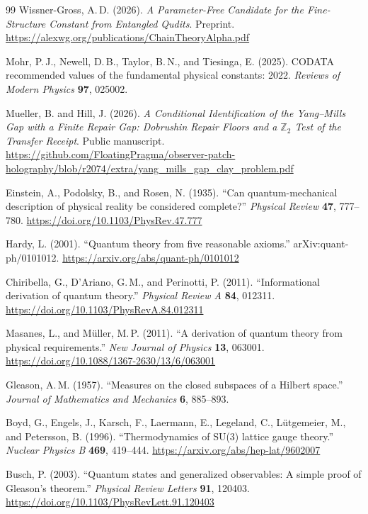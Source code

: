 \documentclass[11pt]{article}
\theoremstyle{definition}
\theoremstyle{remark}
\begin{document}
{\begin{thebibliography}{99}
Wissner-Gross, A.\,D. (2026).
\emph{A Parameter-Free Candidate for the Fine-Structure Constant from Entangled Qudits}.
Preprint.
\url{https://alexwg.org/publications/ChainTheoryAlpha.pdf}

Mohr, P.\,J., Newell, D.\,B., Taylor, B.\,N., and Tiesinga, E. (2025).
CODATA recommended values of the fundamental physical constants: 2022.
\emph{Reviews of Modern Physics} \textbf{97}, 025002.

Mueller, B. and Hill, J. (2026). \emph{A Conditional Identification of the Yang--Mills Gap with a Finite Repair Gap: Dobrushin Repair Floors and a \(\mathbb Z_2\) Test of the Transfer Receipt}. Public manuscript.
\url{https://github.com/FloatingPragma/observer-patch-holography/blob/r2074/extra/yang_mills_gap_clay_problem.pdf}

Einstein, A., Podolsky, B., and Rosen, N. (1935). ``Can quantum-mechanical
description of physical reality be considered complete?''
\emph{Physical Review} \textbf{47}, 777--780.
\url{https://doi.org/10.1103/PhysRev.47.777}

Hardy, L. (2001). ``Quantum theory from five reasonable axioms.''
arXiv:quant-ph/0101012.
\url{https://arxiv.org/abs/quant-ph/0101012}

Chiribella, G., D'Ariano, G.\,M., and Perinotti, P. (2011).
``Informational derivation of quantum theory.''
\emph{Physical Review A} \textbf{84}, 012311.
\url{https://doi.org/10.1103/PhysRevA.84.012311}

Masanes, L., and M\"uller, M.\,P. (2011).
``A derivation of quantum theory from physical requirements.''
\emph{New Journal of Physics} \textbf{13}, 063001.
\url{https://doi.org/10.1088/1367-2630/13/6/063001}

Gleason, A.\,M. (1957). ``Measures on the closed subspaces of a Hilbert
space.'' \emph{Journal of Mathematics and Mechanics} \textbf{6}, 885--893.

Boyd, G., Engels, J., Karsch, F., Laermann, E., Legeland, C., L\"utgemeier,
M., and Petersson, B. (1996). ``Thermodynamics of SU(3) lattice gauge
theory.'' \emph{Nuclear Physics B} \textbf{469}, 419--444.
\url{https://arxiv.org/abs/hep-lat/9602007}

Busch, P. (2003). ``Quantum states and generalized observables: A simple
proof of Gleason's theorem.'' \emph{Physical Review Letters} \textbf{91},
120403. \url{https://doi.org/10.1103/PhysRevLett.91.120403}


\end{thebibliography}}
\end{document}

